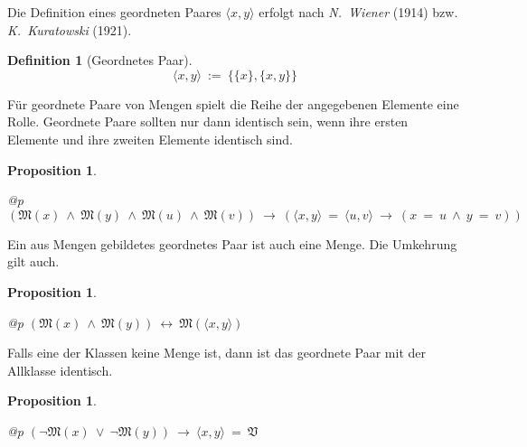 \documentclass[a4paper,german,10pt,twoside]{book}
\newtheorem{prop}[thm]{Proposition}
\theoremstyle{definition}
\newtheorem{defn}[thm]{Definition}
\theoremstyle{remark}
\begin{document}
\par
Die Definition eines geordneten Paares $\langle x, y\rangle$ erfolgt nach \emph{N.~Wiener} (1914) bzw. \emph{K.~Kuratowski} (1921).

\begin{defn}[Geordnetes Paar]
\label{definition:orderedPair} \hypertarget{definition:orderedPair}{}
$$\langle x, y \rangle\ := \ \{ \{ x \}, \{ x, y \} \}$$

\end{defn}




\par
F{\"u}r geordnete Paare von Mengen spielt die Reihe der angegebenen Elemente
eine Rolle. Geordnete Paare sollten nur dann identisch sein, wenn
ihre ersten Elemente und ihre zweiten Elemente identisch sind.

\begin{prop}
\label{theorem:orderedPairEquality} \hypertarget{theorem:orderedPairEquality}{}
\mbox{}
\begin{longtable}{{@{\extracolsep{\fill}}p{\linewidth}}}
\centering $(\mathfrak{M}(x)\ \land \ \mathfrak{M}(y)\ \land \ \mathfrak{M}(u)\ \land \ \mathfrak{M}(v))\ \rightarrow \ (\langle x, y \rangle \ =  \ \langle u, v \rangle\ \rightarrow \ (x \ =  \ u\ \land \ y \ =  \ v))$
\end{longtable}

\end{prop}




\par
Ein aus Mengen gebildetes geordnetes Paar ist auch eine Menge. 
Die Umkehrung gilt auch.

\begin{prop}
\label{theorem:orderedPairOfSets} \hypertarget{theorem:orderedPairOfSets}{}
\mbox{}
\begin{longtable}{{@{\extracolsep{\fill}}p{\linewidth}}}
\centering $(\mathfrak{M}(x)\ \land \ \mathfrak{M}(y))\ \leftrightarrow \ \mathfrak{M}(\langle x, y \rangle)$
\end{longtable}

\end{prop}




\par
Falls eine der Klassen keine Menge ist, dann ist das geordnete Paar
mit der Allklasse identisch.

\begin{prop}
\label{theorem:orderedPairWithNonSet} \hypertarget{theorem:orderedPairWithNonSet}{}
\mbox{}
\begin{longtable}{{@{\extracolsep{\fill}}p{\linewidth}}}
\centering $(\neg \mathfrak{M}(x)\ \lor \ \neg \mathfrak{M}(y))\ \rightarrow \ \langle x, y \rangle \ =  \ \mathfrak{V}$
\end{longtable}

\end{prop}
\end{document}
